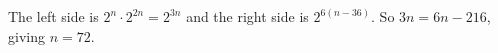 The left side is $2^n\cdot2^{2n}=2^{3n}$ and the right side is $2^{6(n-36)}$. So $3n=6n-216$, giving $n=\boxed{72}$.
